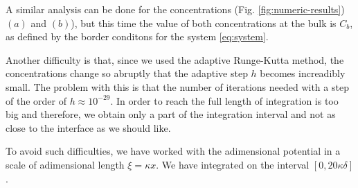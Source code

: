 A similar analysis can be done for the concentrations (Fig.  \ref{fig:numeric-results}) $(a)$ and $(b)$), but this time the value of both concentrations at the bulk is $C_b$, as defined by the border conditons for the system \ref{eq:system}.



Another difficulty is that, since we used the adaptive Runge-Kutta method, the concentrations change so abruptly that the adaptive step $h$ becomes increadibly small. The problem with this is that the number of iterations needed with a step of the order of $h\approx 10^{-29}$. In order to reach the full length of integration is too big and therefore, we obtain only a part of the integration interval and not as close to the interface as we should like. 

To avoid such difficulties, we have worked with the adimensional potential in a scale of adimensional length $\xi = \kappa x$. We have integrated on the interval $[0, 20 \kappa \delta]$.






